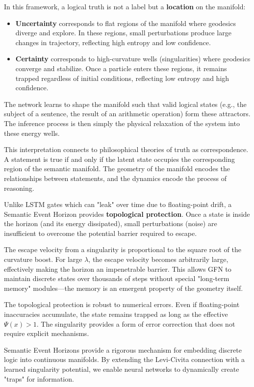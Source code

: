 \documentclass[12pt,letterpaper,twoside]{article}
\begin{document}
In this framework, a logical truth is not a label but a \textbf{location} on the manifold:
\begin{itemize}
    \item \textbf{Uncertainty} corresponds to flat regions of the manifold where geodesics diverge and explore. In these regions, small perturbations produce large changes in trajectory, reflecting high entropy and low confidence.
    \item \textbf{Certainty} corresponds to high-curvature wells (singularities) where geodesics converge and stabilize. Once a particle enters these regions, it remains trapped regardless of initial conditions, reflecting low entropy and high confidence.
\end{itemize}

The network learns to shape the manifold such that valid logical states (e.g., the subject of a sentence, the result of an arithmetic operation) form these attractors. The inference process is then simply the physical relaxation of the system into these energy wells.

This interpretation connects to philosophical theories of truth as correspondence. A statement is true if and only if the latent state occupies the corresponding region of the semantic manifold. The geometry of the manifold encodes the relationships between statements, and the dynamics encode the process of reasoning.

Unlike LSTM gates which can "leak" over time due to floating-point drift, a Semantic Event Horizon provides \textbf{topological protection}. Once a state is inside the horizon (and its energy dissipated), small perturbations (noise) are insufficient to overcome the potential barrier required to escape.

The escape velocity from a singularity is proportional to the square root of the curvature boost. For large $\lambda$, the escape velocity becomes arbitrarily large, effectively making the horizon an impenetrable barrier. This allows GFN to maintain discrete states over thousands of steps without special "long-term memory" modules—the memory is an emergent property of the geometry itself.

The topological protection is robust to numerical errors. Even if floating-point inaccuracies accumulate, the state remains trapped as long as the effective $\Psi(x) > 1$. The singularity provides a form of error correction that does not require explicit mechanisms.

Semantic Event Horizons provide a rigorous mechanism for embedding discrete logic into continuous manifolds. By extending the Levi-Civita connection with a learned singularity potential, we enable neural networks to dynamically create "traps" for information.
\end{document}
